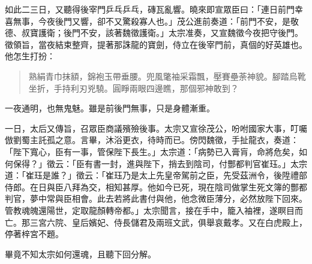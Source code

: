如此二三日，又聽得後宰門乒乓乒乓，磚瓦亂響。曉來即宣眾臣曰：「連日前門幸喜無事，今夜後門又響，卻不又驚殺寡人也。」茂公進前奏道：「前門不安，是敬德、叔寶護衛；後門不安，該著魏徵護衛。」太宗准奏，又宣魏徵今夜把守後門。徵領旨，當夜結束整齊，提著那誅龍的寶劍，侍立在後宰門前，真個的好英雄也。他怎生打扮：
\begin{quote}
熟絹青巾抹額，錦袍玉帶垂腰。兜風氅袖采霜飄，壓賽壘荼神貌。腳踏烏靴坐折，手持利刃兇驍。圓睜兩眼四邊瞧，那個邪神敢到？
\end{quote}

一夜通明，也無鬼魅。雖是前後門無事，只是身體漸重。

一日，太后又傳旨，召眾臣商議殯殮後事。太宗又宣徐茂公，吩咐國家大事，叮囑倣劉蜀主託孤之意。言畢，沐浴更衣，待時而已。傍閃魏徵，手扯龍衣，奏道：「陛下寬心，臣有一事，管保陛下長生。」太宗道：「病勢已入膏肓，命將危矣，如何保得？」徵云：「臣有書一封，進與陛下，捎去到陰司，付酆都判官崔珏。」太宗道：「崔珏是誰？」徵云：「崔珏乃是太上先皇帝駕前之臣，先受茲洲令，後陞禮部侍郎。在日與臣八拜為交，相知甚厚。他如今已死，現在陰司做掌生死文簿的酆都判官，夢中常與臣相會。此去若將此書付與他，他念微臣薄分，必然放陛下回來。管教魂魄還陽世，定取龍顏轉帝都。」太宗聞言，接在手中，籠入袖裡，遂瞑目而亡。那三宮六院、皇后嬪妃、侍長儲君及兩班文武，俱舉哀戴孝。又在白虎殿上，停著梓宮不題。

畢竟不知太宗如何還魂，且聽下回分解。

